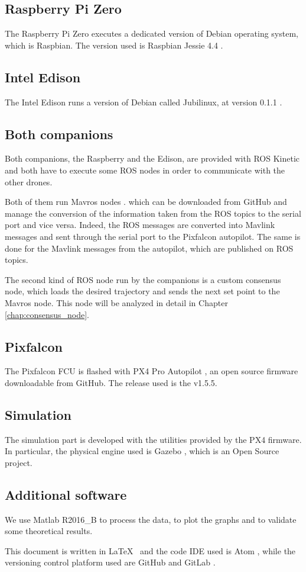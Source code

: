 \subsection{Raspberry Pi Zero}
The Raspberry Pi Zero executes a dedicated version of Debian operating system,
which is Raspbian. The version used is Raspbian Jessie 4.4 \cite{raspbian}.

\subsection{Intel Edison}
The Intel Edison runs a version of Debian called Jubilinux, at version 0.1.1 \cite{jubilinux}.

\subsection{Both companions}
Both companions, the Raspberry and the Edison, are provided with ROS Kinetic and
both have to execute some ROS nodes in order to communicate with the other drones.

Both of them run Mavros nodes \cite{mavros}.
which can be downloaded from GitHub and manage the conversion of the
information taken from the ROS topics to the serial port and vice versa. Indeed,
the ROS messages are converted into Mavlink messages and sent through the serial port
to the Pixfalcon autopilot. The same is done for the Mavlink messages from the
autopilot, which are published on ROS topics.

The second kind of ROS node run by the companions is a custom consensus node, which
loads the desired trajectory and sends the next set point to the Mavros node.
This node will be analyzed in detail in Chapter \ref{chap:consensus_node}.

\subsection{Pixfalcon}
The Pixfalcon FCU is flashed with PX4 Pro Autopilot \cite{px4},
an open source firmware downloadable from GitHub.
The release used is the v1.5.5.

\subsection{Simulation}
The simulation part is developed with the utilities provided by the PX4 firmware.
In particular, the physical engine used is Gazebo \cite{gazebo}, which is an Open
Source project.

\subsection{Additional software}
We use Matlab R2016\_B \cite{matlab} to process the data, to plot the graphs and
to validate some theoretical results.

This document is written in  \LaTeX \ \cite{latex} and the code IDE used is Atom \cite{atom},
while the versioning control platform used are GitHub \cite{github} and GitLab \cite{gitlab}.
